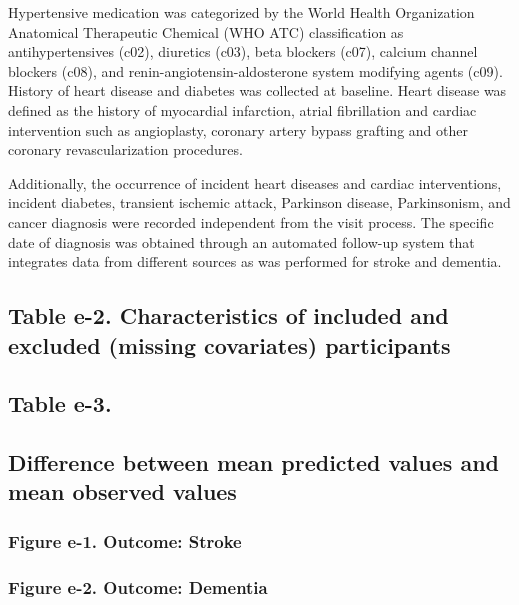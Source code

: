 \documentclass[
]{book}
\begin{document}
Hypertensive medication was categorized by the World Health Organization Anatomical Therapeutic Chemical (WHO ATC) classification as antihypertensives (c02), diuretics (c03), beta blockers (c07), calcium channel blockers (c08), and renin-angiotensin-aldosterone system modifying agents (c09). History of heart disease and diabetes was collected at baseline. Heart disease was defined as the history of myocardial infarction, atrial fibrillation and cardiac intervention such as angioplasty, coronary artery bypass grafting and other coronary revascularization procedures\autocite{leening2012}.

Additionally, the occurrence of incident heart diseases and cardiac interventions, incident diabetes, transient ischemic attack, Parkinson disease, Parkinsonism, and cancer diagnosis were recorded independent from the visit process. The specific date of diagnosis was obtained through an automated follow-up system that integrates data from different sources as was performed for stroke and dementia.

\hypertarget{table-e-2.-characteristics-of-included-and-excluded-missing-covariates-participants}{%
\subsection{Table e-2. Characteristics of included and excluded (missing covariates) participants}\label{table-e-2.-characteristics-of-included-and-excluded-missing-covariates-participants}}

\hypertarget{table-e-3.}{%
\subsection{Table e-3.}\label{table-e-3.}}

\hypertarget{difference-between-mean-predicted-values-and-mean-observed-values}{%
\subsection{Difference between mean predicted values and mean observed values}\label{difference-between-mean-predicted-values-and-mean-observed-values}}

\hypertarget{figure-e-1.-outcome-stroke}{%
\subsubsection{Figure e-1. Outcome: Stroke}\label{figure-e-1.-outcome-stroke}}

\hypertarget{figure-e-2.-outcome-dementia}{%
\subsubsection{Figure e-2. Outcome: Dementia}\label{figure-e-2.-outcome-dementia}}
\end{document}
